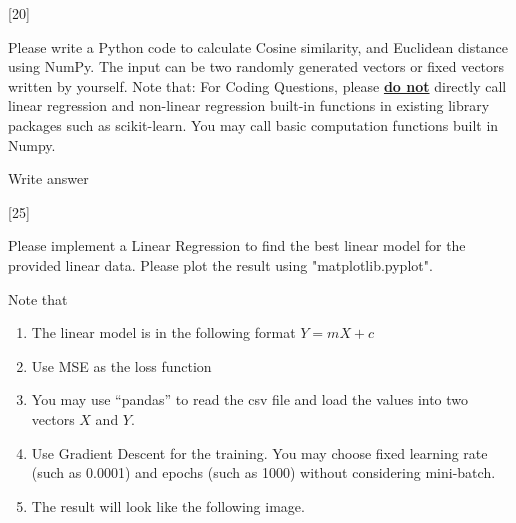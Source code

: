 \documentclass[12pt,letterpaper, onecolumn]{exam}
\begin{document}
\begin{questions}

    \pagebreak

    [20]

    Please write a Python code to calculate Cosine similarity, and Euclidean distance using NumPy. 
    The input can be two randomly generated vectors or fixed vectors written by yourself. 
    Note that: For Coding Questions, please \textbf{\underline{do not}} directly call linear regression and non-linear 
    regression built-in functions in existing library packages such as scikit-learn. You may call basic 
    computation functions built in Numpy.

    \begin{solution}
        Write answer
    \end{solution}

    \pagebreak

    [25]

    Please implement a Linear Regression to find the best linear model for the provided
    linear data. Please plot the result using "matplotlib.pyplot".

    Note that

    \begin{enumerate}[label=(\arabic*)]
        \item The linear model is in the following format $Y=mX+c$
        \item Use MSE as the loss function
        \item You may use “pandas” to read the csv file and load the values into two vectors $X$ and $Y$.
        \item Use Gradient Descent for the training. You may choose fixed learning rate (such as
        0.0001) and epochs (such as 1000) without considering mini-batch.
        \item The result will look like the following image.
    \end{enumerate}


\end{questions}
\end{document}

